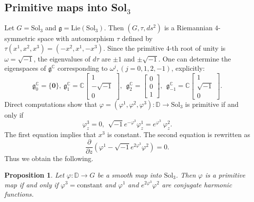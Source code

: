 \documentclass[12pt]{amsart}
\newtheorem{Proposition}[Theorem]{Proposition}
\theoremstyle{definition}
\theoremstyle{remark}
\numberwithin{equation}{section}
\begin{document}
\subsection{Primitive maps into Sol$_3$}\label{subsc:primitive}
 Let $G = \mathrm{Sol}_3$ and 
 $\mathfrak g = \mathrm{Lie} (\mathrm{Sol}_3)$.
 Then 
 $(G, \tau, ds^2)$ is a Riemannian $4$-symmetric space 
 with automorphism $\tau$ defined by 
 $\tau (x^1, x^2, x^3) = (-x^2, x^1, -x^3)$.
 Since the primitive $4$-th root
 of unity is $\omega = \sqrt{-1}$,
 the eigenvalues of $d \tau$ are
 $\pm 1$ and $\pm{\sqrt{-1}}$. 
 One can determine the eigenspaces
 of ${\mathfrak g}^\mathbb{C}$
 corresponding to $\omega^j,  (j = 0, 1, 2, -1)$, explicitly:
\begin{equation*}
{\mathfrak g}^\mathbb{C}_{0}=\{{\mathbf 0}\},\ 
{\mathfrak g}^\mathbb{C}_{1}=
{\mathbb C}
\left[
\begin{array}{c}
1 \\ -\sqrt{-1} \\ 0
\end{array}
\right],
\ \ 
{\mathfrak g}^\mathbb{C}_{2}
 =
\left[
\begin{array}{c}
0 \\ 0 \\ 1
\end{array}
\right]
,\ \
{\mathfrak g}^\mathbb{C}_{-1}=
{\mathbb C}
\left[
\begin{array}{c}
1 \\ \sqrt{-1} \\ 0
\end{array}
\right].
\end{equation*}
Direct computations show that
$\varphi=(\varphi^1,\varphi^2,\varphi^3)
:{\mathbb D}\rightarrow \mathrm{Sol}_3$ is primitive if and only if
\begin{equation*}
\varphi^{3}_z=0,\  \ 
\sqrt{-1}e^{-\varphi^3}\varphi^{1}_z=e^{\varphi^3}\>\varphi^{2}_z.
\end{equation*}
The first equation implies that $x^3$ is constant.
The second equation is rewritten as
\begin{equation*}
\frac{\partial}{\partial z}
\left(
\varphi^1 - \sqrt{-1}e^{2\varphi^3}\varphi^2
\right)=0.
\end{equation*}
 Thus we obtain the following.
\begin{Proposition}
 Let $\varphi:\mathbb{D}\rightarrow G$
 be a smooth map into $\mathrm{Sol}_3$. Then $\varphi$ is a primitive map if and only if
 $\varphi^{3}=\textrm{constant}$ and $\varphi^1$ and ${e}^{2\varphi^3} \varphi^2$ 
 are conjugate harmonic functions.
\end{Proposition}
\end{document}
